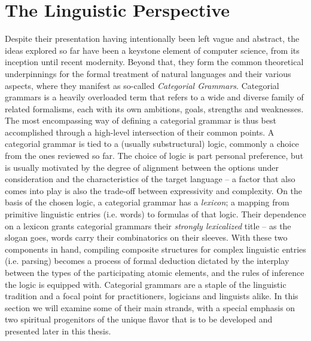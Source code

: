 \section{The Linguistic Perspective}
Despite their presentation having intentionally been left vague and abstract, the ideas explored so far have been a keystone element of computer science, from its inception until recent modernity.
Beyond that, they form the common theoretical underpinnings for the formal treatment of natural languages and their various aspects, where they manifest as so-called \textit{Categorial Grammars}.
Categorial grammars is a heavily overloaded term that refers to a wide and diverse family of related formalisms, each with its own ambitions, goals, strengths and weaknesses.
The most encompassing way of defining a categorial grammar is thus best accomplished through a high-level intersection of their common points.
A categorial grammar is tied to a (usually substructural) logic, commonly a choice from the ones reviewed so far.
The choice of logic is part personal preference, but is usually motivated by the degree of alignment between the options under consideration and the characteristics of the target language -- a factor that also comes into play is also the trade-off between expressivity and complexity.
On the basis of the chosen logic, a categorial grammar has a \textit{lexicon}; a mapping from primitive linguistic entries (i.e. words) to formulas of that logic.
Their dependence on a lexicon grants categorial grammars their \textit{strongly lexicalized} title -- as the slogan goes, words carry their combinatorics on their sleeves.
With these two components in hand, compiling composite structures for complex linguistic entries (i.e. parsing) becomes a process of formal deduction dictated by the interplay between the types of the participating atomic elements, and the rules of inference the logic is equipped with.
Categorial grammars are a staple of the linguistic tradition and a focal point for practitioners, logicians and linguists alike. 
In this section we will examine some of their main strands, with a special emphasis on two spiritual progenitors of the unique flavor that is to be developed and presented later in this thesis.

